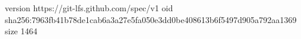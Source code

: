 version https://git-lfs.github.com/spec/v1
oid sha256:7963fb41b78de1cab6a3a27e5fa050e3dd0be408613b6f5497d905a792aa1369
size 1464

